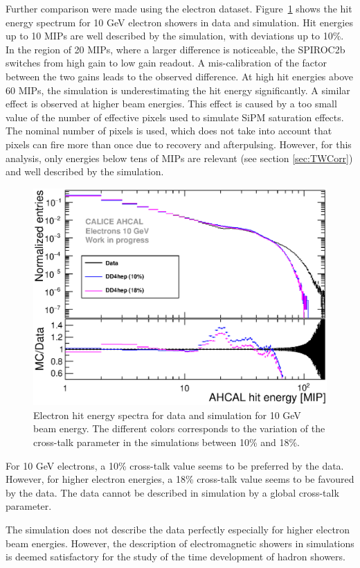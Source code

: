 \documentclass{JINST}
\begin{document}
Further comparison were made using the electron dataset. Figure~\ref{fig:HitEnergy10GeVe} shows the hit energy spectrum for 10 GeV electron showers in data and simulation. Hit energies up to 10 MIPs are well described by the simulation, with deviations up to 10\%. In the region of 20 MIPs, where a larger difference is noticeable, the SPIROC2b switches from high gain to low gain readout. A mis-calibration of the factor between the two gains leads to the observed difference. At high hit energies above 60 MIPs, the simulation is underestimating the hit energy significantly. A similar effect is observed at higher beam energies. This effect is caused by a too small value of the number of effective pixels used to simulate SiPM saturation effects. The nominal number of pixels is used, which does not take into account that pixels can fire more than once due to recovery and afterpulsing. However, for this analysis, only energies below tens of MIPs are relevant (see section \ref{sec:TWCorr}) and well described by the simulation.

\begin{figure}[htbp!]
  \centering
  \includegraphics[width=0.7\linewidth]{fig/HitEnergy_Electrons10GeV_DD4heponly.eps}
  \caption{Electron hit energy spectra for data and simulation for 10 GeV beam energy. The different colors corresponds to the variation of the cross-talk parameter in the simulations between 10\% and 18\%.} \label{fig:HitEnergy10GeVe}
\end{figure}

For 10 GeV electrons, a 10\% cross-talk value seems to be preferred by the data. However, for higher electron energies, a 18\% cross-talk value seems to be favoured by the data. The data cannot be described in simulation by a global cross-talk parameter.

The simulation does not describe the data perfectly especially for higher electron beam energies. However, the description of electromagnetic showers in simulations is deemed satisfactory for the study of the time development of hadron showers.
\end{document}
